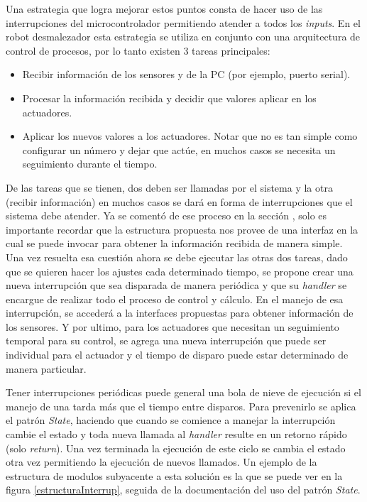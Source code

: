 Una estrategia que logra mejorar estos puntos consta de hacer uso de las interrupciones del microcontrolador permitiendo atender a todos los \textit{inputs}. En el robot desmalezador \cite{paperPomponio} esta estrategia se utiliza en conjunto con una arquitectura de control de procesos, por lo tanto existen 3 tareas principales:

\begin{itemize}
    \item Recibir información de los sensores y de la PC (por ejemplo, puerto serial).
    \item Procesar la información recibida y decidir que valores aplicar en los actuadores.
    \item Aplicar los nuevos valores a los actuadores. Notar que no es tan simple como configurar un número y dejar que actúe, en muchos casos se necesita un seguimiento durante el tiempo.
\end{itemize}

De las tareas que se tienen, dos deben ser llamadas por el sistema y la otra (recibir información) en muchos casos se dará en forma de interrupciones que el sistema debe atender. Ya se comentó de ese proceso en la sección , solo es importante recordar que la estructura propuesta nos provee de una interfaz en la cual se puede invocar para obtener la información recibida de manera simple. Una vez resuelta esa cuestión ahora se debe ejecutar las otras dos tareas, dado que se quieren hacer los ajustes cada determinado tiempo, se propone crear una nueva interrupción que sea disparada de manera periódica y que su \textit{handler} se encargue de realizar todo el proceso de control y cálculo. En el manejo de esa interrupción, se accederá a la interfaces propuestas para obtener información de los sensores. Y por ultimo, para los actuadores que necesitan un seguimiento temporal para su control, se agrega una nueva interrupción que puede ser individual para el actuador y el tiempo de disparo puede estar determinado de manera particular.

Tener interrupciones periódicas puede general una bola de nieve de ejecución si el manejo de una tarda más que el tiempo entre disparos. Para prevenirlo se aplica el patrón \textit{State}, haciendo que cuando se comience a manejar la interrupción cambie el estado y toda nueva llamada al \textit{handler} resulte en un retorno rápido (solo \textit{return}). Una vez terminada la ejecución de este ciclo se cambia el estado otra vez permitiendo la ejecución de nuevos llamados. Un ejemplo de la estructura de modulos subyacente a esta solución es la que se puede ver en la figura \ref{estructuraInterrup}, seguida de la documentación del uso del patrón \textit{State}.

